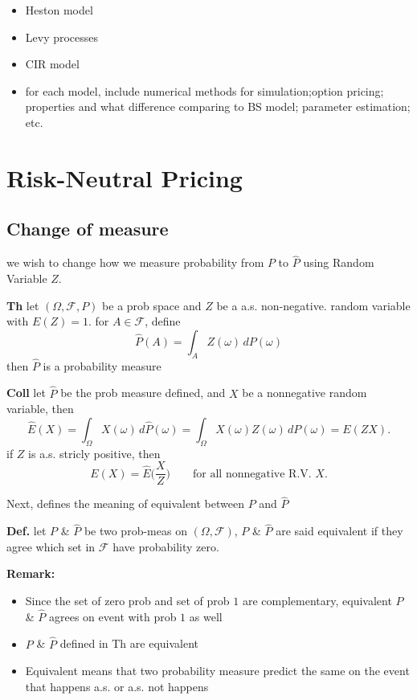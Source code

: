 \documentclass[
  letterpaper,
  DIV=11,
  numbers=noendperiod]{scrreprt}
\providecommand{\tightlist}{%
  \setlength{\itemsep}{0pt}\setlength{\parskip}{0pt}}
\theoremstyle{definition}
\theoremstyle{plain}
\theoremstyle{plain}
\theoremstyle{definition}
\theoremstyle{plain}
\theoremstyle{plain}
\theoremstyle{remark}
\begin{document}
\begin{itemize}
  \begin{itemize}
  \tightlist
  \item
    Heston model
  \item
    Levy processes
  \item
    CIR model
  \item
    for each model, include numerical methods for simulation;option
    pricing; properties and what difference comparing to BS model;
    parameter estimation; etc.
  \end{itemize}
\end{itemize}

\chapter{Risk-Neutral Pricing}\label{risk-neutral-pricing}

\section{Change of measure}\label{change-of-measure}

we wish to change how we measure probability from \(P\) to \(\hat{P}\)
using Random Variable \(Z\).

\textbf{Th} let \((\Omega, \mathcal{F}, P)\) be a prob space and \(Z\)
be a a.s. non-negative. random variable with \(E(Z) = 1\). for
\(A \in \mathcal{F}\), define \[
\hat{P}(A) = \int_A Z(\omega) \, dP(\omega)
\] then \(\hat{P}\) is a probability measure

\textbf{Coll} let \(\hat{P}\) be the prob measure defined, and \(X\) be
a nonnegative random variable, then \[
\hat{E}(X) = \int_\Omega X(\omega) \, d\hat{P}(\omega) = \int_\Omega X(\omega) Z(\omega) \, dP(\omega) = E(ZX).
\] if \(Z\) is a.s. stricly positive, then \[
E(X) = \hat{E}\Big(\frac{X}{Z}\Big) \qquad \text{for all nonnegative R.V. } X.
\]

Next, defines the meaning of equivalent between \(P\) and \(\hat{P}\)

\textbf{Def.} let \(P\) \& \(\hat{P}\) be two prob-meas on
\((\Omega, \mathcal{F})\), \(P\) \& \(\hat{P}\) are said equivalent if
they agree which set in \(\mathcal{F}\) have probability zero.

\textbf{Remark:}

\begin{itemize}
\tightlist
\item
  Since the set of zero prob and set of prob \(1\) are complementary,
  equivalent \(P\) \& \(\hat{P}\) agrees on event with prob \(1\) as
  well
\item
  \(P\) \& \(\hat{P}\) defined in Th are equivalent
\item
  Equivalent means that two probability measure predict the same on the
  event that happens a.s. or a.s. not happens
\end{itemize}
\end{document}
